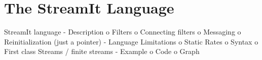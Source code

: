 \section{The StreamIt Language}

StreamIt language 
-	Description
o	Filters
o	Connecting filters
o	Messaging
o	Reinitialization (just a pointer)
-	Language Limitations
o	Static Rates
o	Syntax 
o	First class Streams / finite streams
-	Example
o	Code
o	Graph

